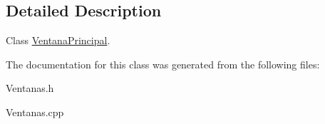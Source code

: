\subsection{Detailed Description}
Class \hyperlink{class_ventana_principal}{Ventana\+Principal}. 

The documentation for this class was generated from the following files\+:\begin{DoxyCompactItemize}
\item 
Ventanas.\+h\item 
Ventanas.\+cpp\end{DoxyCompactItemize}
